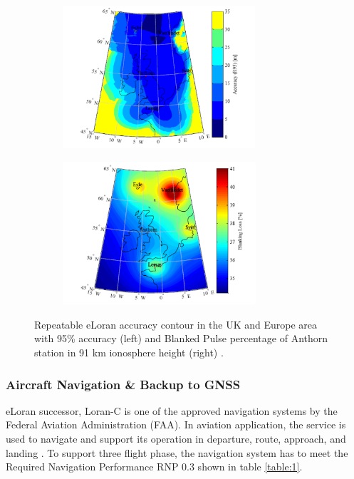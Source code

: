 \begin{figure}[!ht]
\begin{center}
%    
  \begin{subfigure}[b]{0.4\textwidth}
    \includegraphics[height=5.3cm]{Figures/ELORAN_maritime_contour_UK.PNG}
  \end{subfigure}
%
  \begin{subfigure}[b]{0.5\textwidth}
    \includegraphics[height=5.3cm]{Figures/ELORAN_blanking_percentage.PNG}
  \end{subfigure}
%  
  \caption{Repeatable eLoran accuracy contour in the UK and Europe area with 95\% accuracy (left) and Blanked Pulse percentage of Anthorn station in 91 km ionosphere height (right) \cite{SafarAIONS}.}
    \label{fig:eloranblanked}
\end{center}
\end{figure}

\subsubsection{Aircraft Navigation \& Backup to GNSS}
eLoran successor, Loran-C is one of the approved navigation systems by the Federal Aviation Administration (FAA). In aviation application, the service is used to navigate and support its operation in departure, route, approach, and landing \cite{InternationalLORANAssociation2007EnhancedApril}\cite{BartoneH-fieldApplications}. To support three flight phase, the navigation system has to meet the Required Navigation Performance RNP 0.3 shown in table \ref{table:1}.\\

